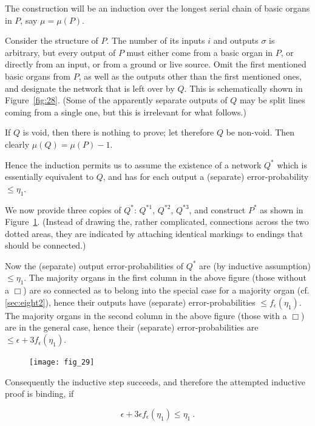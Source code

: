\documentclass[twocolumn,preprintnumbers,amsmath,amssymb,floatfix]{revtex4}
\begin{document}
The construction will be an induction over the longest serial
chain of basic organs in $P$, say $\mu=\mu(P)$.

Consider the structure of $P$. The number of its inputs $i$ and
outputs $\sigma$ is arbitrary, but every output of $P$ must either
come from a basic organ in $P$, or directly from an input, or from
a ground or live source. Omit the first mentioned basic organs
from $P$, as well as the outputs other than the first mentioned
ones, and designate the network that is left over by $Q$. This is
schematically shown in Figure~\ref{fig:28}. (Some of the
apparently separate outputs of $Q$ may be split lines coming from
a single one, but this is irrelevant for what follows.)

If $Q$ is void, then there is nothing to prove; let therefore $Q$
be non-void. Then clearly $\mu(Q)=\mu(P)-1$.

Hence the induction permits us to assume the existence of a
network $Q^*$ which is essentially equivalent to $Q$, and has for
each output a (separate) error-probability $\leq \eta_1$.

We now provide three copies of $Q^*$: $Q^{*1}$, $Q^{*2}$,
$Q^{*3}$, and construct $P^*$ as shown in Figure~\ref{fig:29}.
(Instead of drawing the, rather complicated, connections across
the two dotted areas, they are indicated by attaching identical
markings to endings that should be connected.)

Now the (separate) output error-probabilities of $Q^*$ are (by
inductive assumption) $\leq\eta_1$. The majority organs in the
first column in the above figure (those without a $\Box$) are so
connected as to belong into the special case for a majority organ
(cf. \ref{sec:eight2}), hence their outputs have (separate)
error-probabilities $\leq f_\epsilon(\eta_1)$. The majority organs
in the second column in the above figure (those with a $\Box$) are
in the general case, hence their (separate) error-probabilities
are $\leq\epsilon+3f_\epsilon(\eta_1)$.

\begin{figure}
\texttt{[image: fig\_29]}
\caption{\label{fig:29}}
\end{figure}

Consequently the inductive step succeeds, and therefore the
attempted inductive proof is binding, if

\begin{equation}
\epsilon+3\epsilon f_\epsilon(\eta_1)\leq\eta_1~.\label{eq:12}
\end{equation}
\end{document}
